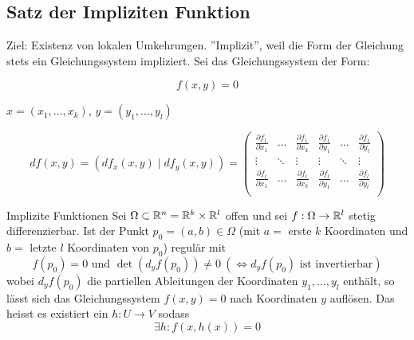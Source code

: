 \subsection{Satz der Impliziten Funktion}

Ziel: Existenz von lokalen Umkehrungen. ''Implizit'', weil die Form der Gleichung stets ein Gleichungssystem impliziert. Sei das Gleichungssystem der Form:

\[
    f(x, y) = 0
\]

$x = (x_1, ..., x_k)$, $y = (y_1, ..., y_l)$

\[
    df(x, y) = (df_x(x, y) \mid df_y(x, y)) = 
        \begin{pmatrix}
            \frac{\partial f_1}{\partial x_1} & \hdots & \frac{\partial f_1}{\partial x_k}
            & \frac{\partial f_1}{\partial y_1} & \hdots & \frac{\partial f_1}{\partial y_l}\\
            
            \vdots & \ddots & \vdots & \vdots & \ddots & \vdots\\
            
            \frac{\partial f_l}{\partial x_1} & \hdots & \frac{\partial f_l}{\partial x_k}
            & \frac{\partial f_l}{\partial y_1} & \hdots & \frac{\partial f_l}{\partial y_l}\\
        \end{pmatrix}
\]

\begin{Satz}{Implizite Funktionen}{}
	Sei $\Omega \subset \mathbb{R}^n = \mathbb{R}^k \times \mathbb{R}^l$ offen und sei $f: \Omega \to \mathbb{R}^l$ stetig differenzierbar. Ist der Punkt $p_0 = (a, b) \in \Omega$ (mit $a=$ erste $k$ Koordinaten und $b=$ letzte $l$ Koordinaten von $p_0$) regulär mit
	\[
    	f(p_0) = 0 \text{ und } \det(d_y f(p_0)) \neq 0\ (\iff d_y f(p_0) \text{ ist invertierbar})
	\]
	wobei $d_yf(p_0)$ die partiellen Ableitungen der Koordinaten $y_1, ..., y_l$ enthält, so lässt sich das Gleichungssystem $f(x, y) = 0$ nach Koordinaten $y$ auflösen. Das heisst es existiert ein $h: U \to V$ sodass 
	\[
  		\exists h: f(x, h(x)) = 0
	\]
\end{Satz}

